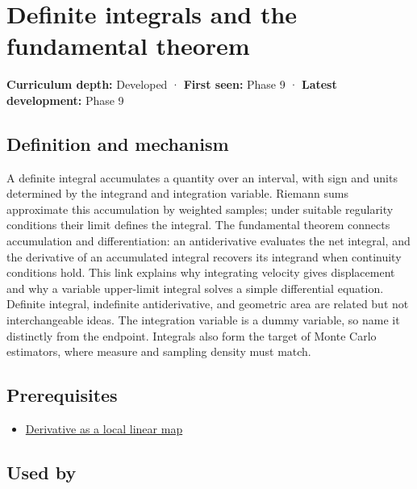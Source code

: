 \hypertarget{appendix-1a50e72435c2}{}\label{referencestart:appendix-1a50e72435c2}
\section{Definite integrals and the fundamental theorem}\label{appendix-1a50e72435c2-definite-integrals-and-the-fundamental-theorem}

\textbf{Curriculum depth:} Developed · \textbf{First seen:} Phase 9 · \textbf{Latest development:} Phase 9

\subsection{Definition and mechanism}\label{appendix-1a50e72435c2-definition-and-mechanism}

A definite integral accumulates a quantity over an interval, with sign and units determined by the integrand and integration variable. Riemann sums approximate this accumulation by weighted samples; under suitable regularity conditions their limit defines the integral. The fundamental theorem connects accumulation and differentiation: an antiderivative evaluates the net integral, and the derivative of an accumulated integral recovers its integrand when continuity conditions hold. This link explains why integrating velocity gives displacement and why a variable upper-limit integral solves a simple differential equation. Definite integral, indefinite antiderivative, and geometric area are related but not interchangeable ideas. The integration variable is a dummy variable, so name it distinctly from the endpoint. Integrals also form the target of Monte Carlo estimators, where measure and sampling density must match.

\subsection{Prerequisites}\label{appendix-1a50e72435c2-prerequisites}

\begin{itemize}
\tightlist
\item
  \hyperref[appendix-7bc181935c42]{Derivative as a local linear map}
\end{itemize}

\subsection{Used by}\label{appendix-1a50e72435c2-used-by}

